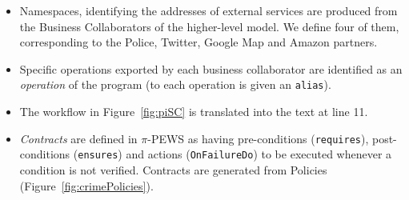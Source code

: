 \begin{itemize}
\item
Namespaces, identifying the addresses of external services are produced from the Business Collaborators of the higher-level model. 
We define four of them, corresponding to the Police, Twitter, Google Map and Amazon partners.
\item
Specific operations exported by each business collaborator are identified as an \textit{operation} of the program (to each operation is given an \texttt{alias}).
\item
The workflow in Figure~\ref{fig:piSC} is translated into the text at line 11.
\item
\textit{Contracts} are defined in $\pi$-PEWS as having pre-conditions (\texttt{requires}), post-conditions (\texttt{ensures}) and actions (\texttt{OnFailureDo}) to be executed whenever a condition is not verified. 
Contracts are generated from Policies (Figure~\ref{fig:crimePolicies}).
\end{itemize}
